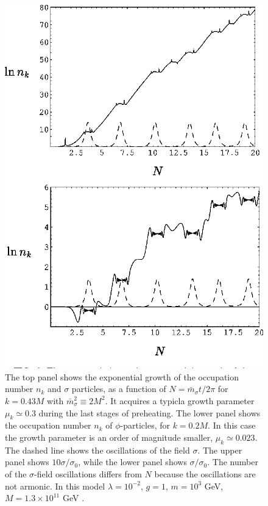 \documentclass[11pt,a4paper,twoside]{book}
\begin{document}
\begin{figure}[t]
	\centering
	\includegraphics[width=0.6\linewidth, height=0.45\textheight]{Images/Chap4/TachyonicModel}
	\caption{The top panel shows the exponential growth of the occupation number $ n_{k} $ and $\sigma$ particles, as a function of $ N=\bar{m}_{\sigma}t/ 2 \pi $ for $ k=0.43M $ with $ \bar{m}_{\sigma}^{2} \equiv 2M^{2} $. It acquires a typicla growth parameter $\mu_{k} \simeq 0.3$ during the last stages of preheating. The lower panel shows the occupation number $ n_{k} $ of $\phi$-particles, for $ k=0.2M $. In this case the growth parameter is an order of magnitude smaller, $\mu_{k} \simeq 0.023$. The dashed line shows the oscillations of the field $\sigma$. The upper panel shows $ 10\sigma/\sigma_{0} $, while the lower panel shows $ \sigma/\sigma_{0}. $ The number of the $\sigma$-field oscillations differs from $ N $ because the oscillations are not armonic. In this model $ \lambda = 10^{-2} $, $ g=1 $, $ m=10^{3} $ GeV, $ M=1.3 \times 10^{11} $ GeV \cite{Chap4:TachyonicPreheating}.}
	\label{fig:tachyonicmodel}
\end{figure}
\end{document}
